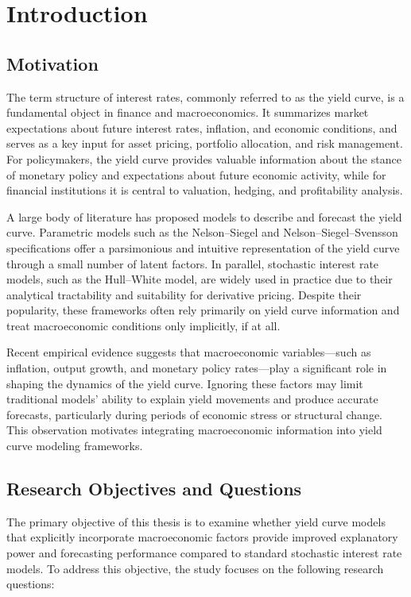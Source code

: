 \chapter{Introduction}


\section{Motivation}
The term structure of interest rates, commonly referred to as the yield curve, is a fundamental object in finance and macroeconomics. It summarizes market expectations about future interest rates, inflation, and economic conditions, and serves as a key input for asset pricing, portfolio allocation, and risk management. For policymakers, the yield curve provides valuable information about the stance of monetary policy and expectations about future economic activity, while for financial institutions it is central to valuation, hedging, and profitability analysis.

A large body of literature has proposed models to describe and forecast the yield curve. Parametric models such as the Nelson–Siegel and Nelson–Siegel–Svensson specifications offer a parsimonious and intuitive representation of the yield curve through a small number of latent factors. In parallel, stochastic interest rate models, such as the Hull–White model, are widely used in practice due to their analytical tractability and suitability for derivative pricing. Despite their popularity, these frameworks often rely primarily on yield curve information and treat macroeconomic conditions only implicitly, if at all.

Recent empirical evidence suggests that macroeconomic variables—such as inflation, output growth, and monetary policy rates—play a significant role in shaping the dynamics of the yield curve. Ignoring these factors may limit traditional models' ability to explain yield movements and produce accurate forecasts, particularly during periods of economic stress or structural change. This observation motivates integrating macroeconomic information into yield curve modeling frameworks.

\section{Research Objectives and Questions}
The primary objective of this thesis is to examine whether yield curve models that explicitly incorporate macroeconomic factors provide improved explanatory power and forecasting performance compared to standard stochastic interest rate models. To address this objective, the study focuses on the following research questions:

